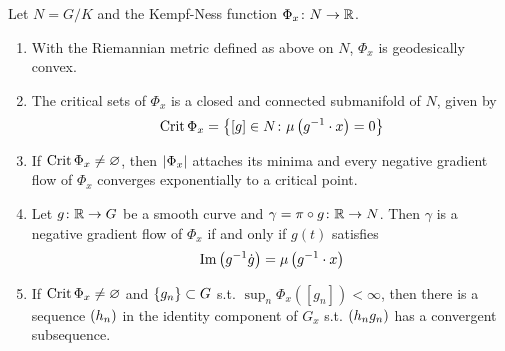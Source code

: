 \documentclass[a4paper,12pt]{article}
\begin{document}
	\begin{thm}[Properties]
		Let $N = G / K$ and the Kempf-Ness function $\Phi_x \colon N \rightarrow \mathbb{R}$.
		\begin{enumerate}
			\item With the Riemannian metric defined as above on $N$, $\Phi_x$ is geodesically convex.
			\item The critical sets of $\Phi_x$ is a closed and connected submanifold of $N$, given by
			\begin{equation*}
				\operatorname{Crit} \Phi_x = \left\{[g] \in N \colon \mu\left(g^{-1}\cdot x\right)  = 0\right\}
			\end{equation*}
			\item If $\operatorname{Crit} \Phi_x \neq \varnothing$, then $\left\lvert\Phi_x\right\lvert$ attaches its minima and every negative gradient flow of $\Phi_x$ converges exponentially to a critical point.
			\item Let $g \colon \mathbb{R} \rightarrow G$ be a smooth curve and $\gamma = \pi \circ g \colon \mathbb{R} \rightarrow N$. Then $\gamma$ is a negative gradient flow of $\Phi_x$ if and only if $g(t)$ satisfies
			\begin{equation*}
				\operatorname{Im}\left(g^{-1}\dot{g}\right) = \mu\left(g^{-1}\cdot x\right)
			\end{equation*}
			\item If $\operatorname{Crit} \Phi_x \neq \varnothing$ and $\left\{g_n\right\} \subset G$ s.t. $\sup_n \Phi_x([g_n]) < \infty$, then there is a sequence $\left(h_n\right)$ in the identity component of $G_x$ s.t. $\left(h_ng_n\right)$ has a convergent subsequence.
		\end{enumerate}
	\end{thm}
\end{document}
